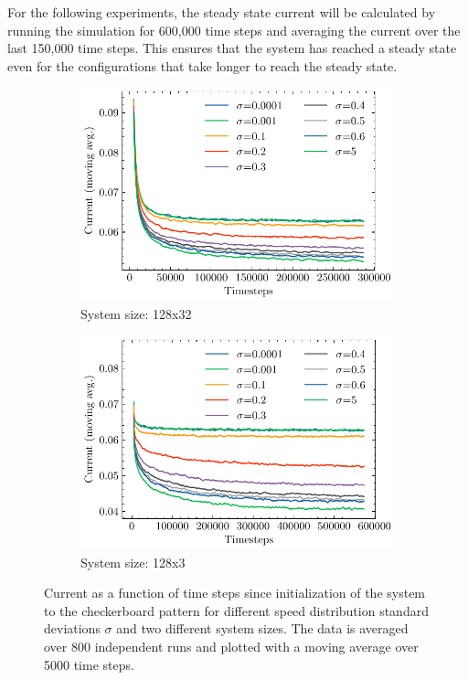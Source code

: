 For the following experiments, the steady state current will be calculated by running the simulation for 600,000 time steps and averaging the current over the last 150,000 time steps. This ensures that the system has reached a steady state even for the configurations that take longer to reach the steady state.

\begin{figure}[H]
    \centering
    \begin{subfigure}{\textwidth}
        \centering
        \includegraphics{currents_fixed_sigma_128x32}
        \caption{System size: 128x32}
        \label{fig:currents_fixed_sigma_128x32}
    \end{subfigure}
    \par\vspace{1cm}
    \begin{subfigure}{\textwidth}
        \centering
        \includegraphics{currents_fixed_sigma_128x3}
        \caption{System size: 128x3}
        \label{fig:currents_fixed_sigma_128x3}
    \end{subfigure}
    \caption{Current as a function of time steps since initialization of the system to the checkerboard pattern for different speed distribution standard deviations $\sigma$ and two different system sizes. The data is averaged over 800 independent runs and plotted with a moving average over 5000 time steps.}
\end{figure}


